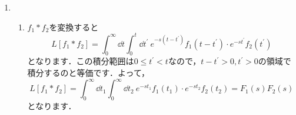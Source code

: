 \documentclass[a4paper,pdflatex,ja=standard]{bxjsarticle}
\begin{document}
\begin{enumerate}
\begin{enumerate}
    \item 
    収束するのは$s\neq 0$です．
    \begin{proof}
      簡単で
      \begin{equation}
        e^{-st}\sin\omega t
        <
        e^{-st}
      \end{equation}
      を積分すればよいです．
    \end{proof}
    値ですが，2回部分積分してみると
    \begin{equation}
      L[\sin\omega t]
      =
      \frac{\omega}{s^2}
      -
      \frac{\omega^2}{s^2}L[\sin\omega t]
    \end{equation}
    となることがわかるので
    \begin{equation}
      L[\sin\omega t]
      =
      \frac{\omega}{s^2+\omega^2}
    \end{equation}
    です．
    
    \item 
    収束するのは$s>0$のときです．証明は$f(t)=t$のときとほぼ同じ．積分の値は，途中で$t=x^2$と変数変換をしてみると
    \begin{align}
      L[\sqrt{t}]
      &=
      \int_0^\infty
      \sqrt{t}e^{-st}
      \dd t
      \nonumber
      \\
      &=
      2\int_0^\infty
      x^2e^{-sx^2}
      \dd x
      \nonumber
      \\
      &=
      \frac{1}{2}\sqrt{\frac{\pi}{s^3}}
    \end{align}
    です\footnote{
      nz先生の講義を覚えてるならGaussian integral
      $$
        \int_0^\infty
        e^{-s x^2}
        \dd x
        =
        \frac{1}{2}\sqrt{\frac{\pi}{s}}
      $$
      を，$s$で微分して
      $$
        \int_0^\infty
        x^2e^{-sx^2}
        \dd x
        =
        \frac{1}{4}
        \sqrt{\frac{\pi}{s^3}}
      $$
      とすれば早いです．
    }．

  \end{enumerate}

  \item 
  \begin{enumerate}
    \item 
    $f_1*f_2$を変換すると
    \begin{equation}
      L[f_1*f_2]
      =
      \int_0^\infty
      \dd t
      \int_0^t
      \dd t^{\prime}\ 
      e^{-s(t-t^{\prime})}
      f_1(t-t^{\prime})
      \cdot
      e^{-st^{\prime}}
      f_2(t^{\prime})
    \end{equation}
    となります．この積分範囲は$0\leq t^{\prime}<t$なので，$t-t^{\prime}>0,t^{\prime}>0$の領域で積分するのと等価です．よって，
    \begin{equation}
      L[f_1*f_2]
      =
      \int_0^\infty
      \dd t_1
      \int_0^\infty
      \dd t_2\ 
      e^{-st_1}
      f_1(t_1)
      \cdot
      e^{-st_2}
      f_2(t_2)
      =
      F_1(s)
      F_2(s)
    \end{equation}
    となります．


\end{enumerate}
\end{enumerate}
\end{document}
